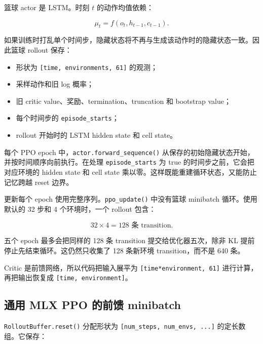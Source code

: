 \documentclass[
  chinese,
  11pt,
  letterpaper,
]{article}
\providecommand{\tightlist}{%
  \setlength{\itemsep}{0pt}\setlength{\parskip}{0pt}}
\begin{document}
篮球 actor 是 LSTM。时刻 \(t\) 的动作均值依赖：

\[
\mu_t=f(o_t,h_{t-1},c_{t-1}).
\]

如果训练时打乱单个时间步，隐藏状态将不再与生成该动作时的隐藏状态一致。因此篮球
rollout 保存：

\begin{itemize}
\tightlist
\item
  形状为 \texttt{{[}time,\ environments,\ 61{]}} 的观测；
\item
  采样动作和旧 log 概率；
\item
  旧 critic value、奖励、termination、truncation 和 bootstrap value；
\item
  每个时间步的 \texttt{episode\_\allowbreak{}starts}；
\item
  rollout 开始时的 LSTM hidden state 和 cell state。
\end{itemize}

每个 PPO epoch 中，\texttt{actor.forward\_sequence()}
从保存的初始隐藏状态开始，并按时间顺序向前执行。在处理
\texttt{episode\_\allowbreak{}starts} 为 true
的时间步之前，它会把对应环境的 hidden state 和 cell state
乘以零。这样既能重建循环状态，又能防止记忆跨越 reset 边界。

更新每个 epoch 使用完整序列。\texttt{ppo\_update()} 中没有篮球 minibatch
循环。使用默认的 32 步和 4 个环境时，一个 rollout 包含：

\[
32\times4=128\text{ 条 transition}.
\]

五个 epoch 最多会把同样的 128 条 transition 提交给优化器五次，除非 KL
提前停止先结束循环。这仍然只收集了 128 条新环境 transition，而不是 640
条。

Critic 是前馈网络，所以代码把输入展平为
\texttt{{[}time*environment,\ 61{]}} 进行计算，再把输出恢复成
\texttt{{[}time,\ environment{]}}。

\subsection{通用 MLX PPO 的前馈
minibatch}\label{ux901aux7528-mlx-ppo-ux7684ux524dux9988-minibatch}

\texttt{RolloutBuffer.reset()} 分配形状为
\texttt{{[}num\_steps,\ num\_envs,\ ...{]}} 的定长数组。它保存：
\end{document}
